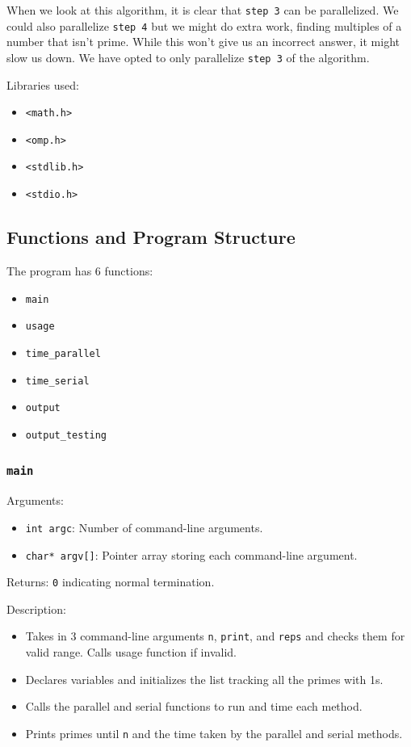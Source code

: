 \documentclass{article}
\begin{document}
\medskip
\noindent
When we look at this algorithm, it is clear that \texttt{step 3} can be parallelized. We could also parallelize \texttt{step 4} but we might do extra work, finding multiples of a number that isn't prime. While this won't give us an incorrect answer, it might slow us down. We have opted to only parallelize \texttt{step 3} of the algorithm.

\medskip
\noindent
Libraries used: 
\begin{itemize}
	\item \texttt{<math.h>}
	\item \texttt{<omp.h>}
    \item \texttt{<stdlib.h>}
    \item \texttt{<stdio.h>}
\end{itemize}

\subsection{Functions and Program Structure}
The program has 6 functions:
\begin{itemize}
    \item \texttt{main}
    \item \texttt{usage}
    \item \texttt{time\_parallel}
    \item \texttt{time\_serial}
    \item \texttt{output}
    \item \texttt{output\_testing}
\end{itemize}

\subsubsection{\texttt{main}}
Arguments: 
    \begin{itemize}
	    \item \texttt{int argc}: Number of command-line arguments.
        \item \texttt{char* argv[]}: Pointer array storing each command-line argument. 
    \end{itemize}
Returns: \texttt{0} indicating normal termination.

\medskip
\noindent
Description: 
\begin{itemize}
    \item Takes in 3 command-line arguments \texttt{n}, \texttt{print}, and \texttt{reps} and checks them for valid range. Calls usage function if invalid.

    \item Declares variables and initializes the list tracking all the primes with 1s. 
    
    \item Calls the parallel and serial functions to run and time each method.

    \item Prints primes until \texttt{n} and the time taken by the parallel and serial methods.
\end{itemize}
\end{document}
